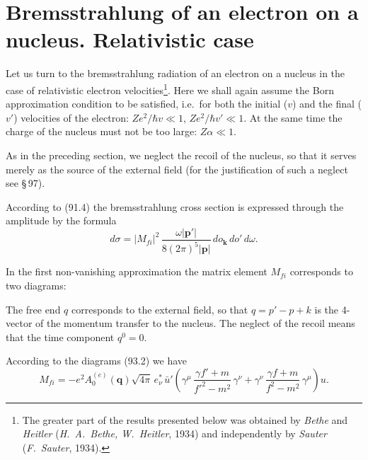 
\section{Bremsstrahlung of an electron on a nucleus. Relativistic case}


Let us turn to the bremsstrahlung radiation of an electron on a nucleus in the case of relativistic electron velocities\footnote{The greater part of the results presented below was obtained by \emph{Bethe} and \emph{Heitler} (\emph{H.~A.~Bethe, W.~Heitler}, 1934) and independently by \emph{Sauter} (\emph{F.~Sauter}, 1934).}. Here we shall again assume the Born approximation condition to be satisfied, i.e.\ for both the initial ($v$) and the final ($v'$) velocities of the electron: $Ze^2/\hbar v \ll 1$, $Ze^2/\hbar v' \ll 1$. At the same time the charge of the nucleus must not be too large: $Z\alpha \ll 1$.

As in the preceding section, we neglect the recoil of the nucleus, so that it serves merely as the source of the external field (for the justification of such a neglect see \S\,97).

According to (91.4) the bremsstrahlung cross section is expressed through the amplitude by the formula
\begin{equation}
d\sigma = |M_{fi}|^2\,\frac{\omega|\mathbf{p}'|}{8(2\pi)^5|\mathbf{p}|}\,do_\mathbf{k}\,do'\,d\omega.
\label{eq:93.1}
\end{equation}

In the first non-vanishing approximation the matrix element $M_{fi}$ corresponds to two diagrams:
\setcounter{equation}{2}

The free end $q$ corresponds to the external field, so that $q = p' - p + k$ is the 4-vector of the momentum transfer to the nucleus. The neglect of the recoil means that the time component $q^0 = 0$.

According to the diagrams (93.2) we have
\begin{equation}
M_{fi} = -e^2 A_0^{(e)}(\mathbf{q})\sqrt{4\pi}\,e_\nu^*\,\bar{u}'\left(\gamma^\mu\,\frac{\gamma f'+m}{f'^2 - m^2}\,\gamma^\nu + \gamma^\nu\,\frac{\gamma f + m}{f^2 - m^2}\,\gamma^\mu\right)u.
\label{eq:93.3}
\end{equation}

